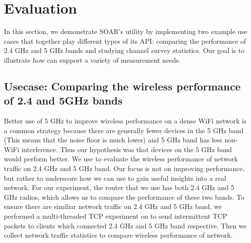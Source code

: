 \chapter{Evaluation} 
\label{sec.evaluation}
In this section, we demonstrate SOAR's utility by implementing two example use cases that together play different types of its API: comparing the performance of 2.4 GHz and 5 GHz bands and studying channel survey statistics. Our goal is to illustrate how \sysname can support a variety of measurement needs.
\section{Usecase: Comparing the wireless performance of 2.4 and 5GHz bands}
\label{sec.usecase1}
Better use of 5 GHz to improve wireless performance on a dense WiFi network is a common strategy because there are generally fewer devices in the 5 GHz band (This means that the noise floor is much lower) and 5 GHz band has less non-WiFi interference. Thus our hypothesis was that devices on the 5 GHz band would perform better.
\newline
We use \sysname to evaluate the wireless performance of network traffic on 2.4 GHz and 5 GHz band. Our focus is not on improving performance, but rather to underscore how we can use \sysname to gain useful insights into a real network.
For our experiment, the router that we use has both 2.4 GHz and 5 GHz radios, which allows us to compare the performance of these two bands. To ensure there are similiar network traffic on 2.4 GHz and 5 GHz band, we performed a multi-threaded TCP experiment on \sysname to send intermittent TCP packets to clients which connected 2.4 GHz and 5 GHz band respective. Then we collect network traffic statistics to compare wireless performance of network.

